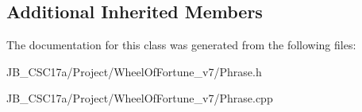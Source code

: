 \subsection*{Additional Inherited Members}


The documentation for this class was generated from the following files\+:\begin{DoxyCompactItemize}
\item 
J\+B\+\_\+\+C\+S\+C17a/\+Project/\+Wheel\+Of\+Fortune\+\_\+v7/Phrase.\+h\item 
J\+B\+\_\+\+C\+S\+C17a/\+Project/\+Wheel\+Of\+Fortune\+\_\+v7/Phrase.\+cpp\end{DoxyCompactItemize}
